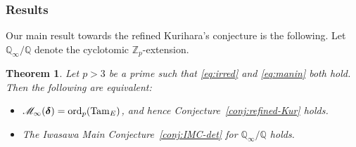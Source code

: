 \documentclass[10pt,reqno]{amsart}
\numberwithin{equation}{section}
\theoremstyle{plain}
\theoremstyle{definition}
\theoremstyle{definition}
\theoremstyle{plain}
\theoremstyle{plain}
\theoremstyle{plain}
\theoremstyle{plain}
\theoremstyle{plain}
\newtheorem{thmintro}{Theorem}
\theoremstyle{plain}
\newcommand{\Z}{\mathbb{Z}}
\newcommand{\Q}{\mathbb{Q}}
\begin{document}

\subsubsection{Results} %



Our main result towards the refined Kurihara's conjecture is the following. Let $\Q_\infty/\Q$ denote the cyclotomic $\Z_p$-extension.



\begin{thmintro}
\label{thmintro-Kur}
Let $p>3$ be a prime such that \eqref{eq:irred} and \eqref{eq:manin} both hold. Then the following are equivalent:
\begin{itemize}
\item[(i)] $\mathscr{M}_{\infty}(\boldsymbol{\delta})={\rm ord}_p({\rm Tam}_E)$, and hence Conjecture~\ref{conj:refined-Kur} holds.
\item[(ii)] The Iwasawa Main Conjecture~\ref{conj:IMC-det} for $\Q_\infty/\Q$ holds.
\end{itemize}
\end{thmintro}
\end{document}
